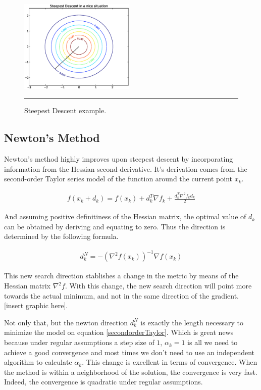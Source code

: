 \begin{figure}[htbp]
  \centering
  \includegraphics[width=5.5cm]{Figures/steepestDescentNice}
  \rule{35em}{0.1pt}
  \caption[step. Desc.]{Steepest Descent example.  }
  \label{fig:steepestdescentugly}
\end{figure}

\subsection{Newton's Method}

Newton's method highly improves upon steepest descent by incorporating information from the Hessian second derivative.   It's derivation comes from the second-order Taylor series model of the function around the current point $x_k$. 

\begin{equation} \label{secondorderTaylor}
  \begin{aligned}
    f(x_k + d_k) = f(x_k) + d_k^T \nabla f_k + \frac{d_k^T \nabla ^2 f_k d_k}{2}  
  \end{aligned}
\end{equation}

And assuming positive definitiness of the Hessian matrix, the optimal value of $d_k$ can be obtained by deriving and equating to zero.  Thus the direction is determined by the following formula.

\begin{equation} \label{NewtonDir}
  \begin{aligned}
    d_k^N = -\left(\nabla^2 f(x_k) \right)^{-1} \nabla f(x_k)
  \end{aligned}
\end{equation}

This new search direction stablishes a change in the metric by means of the Hessian matrix $\nabla ^2 f$.  With this change, the new search direction will point more towards the actual minimum, and not in the same direction of the gradient. [insert graphic here].

Not only that, but the newton direction $d_k^N$ is exactly the length necessary to minimize the model on equation \ref{secondorderTaylor}.  Which is great news because under regular assumptions a step size of $1$, $\alpha_k = 1$ is all we need to achieve a good convergence and most times we don't need to use an independent algorithm to calculate $\alpha_k$.  This change is excellent in terms of convergence.  When the method is within a neighborhood of the solution, the convergence is very fast.  Indeed, the convergence is quadratic under regular assumptions\citep{nocedal}.


